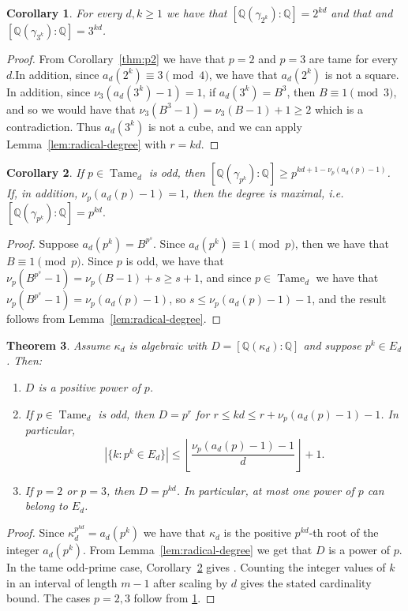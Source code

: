 \documentclass{article}
\theoremstyle{plain}
\newtheorem{theorem}{Theorem}[section]
\newtheorem{corollary}[theorem]{Corollary}
\theoremstyle{definition}
\theoremstyle{remark}
\newcommand{\Q}{\mathbb{Q}}
\DeclareMathOperator{\Tame}{Tame}
\begin{document}
\begin{corollary}\label{cor:degree-23}
For every $d,k\ge1$ we have that $[\Q(\gamma_{2^k}):\Q]=2^{kd}$ and that 
and $[\Q(\gamma_{3^k}):\Q]=3^{kd}$.
\end{corollary}

\begin{proof}
From Corollary~\ref{thm:p2} we have that $p=2$ and $p=3$ are tame for every $d$.In addition, since $a_d(2^k)\equiv3\pmod4$, we have that $a_d(2^k)$ is not a square. In addition, since $\nu_3(a_d(3^k)-1)=1$, if $a_d(3^k)=B^3$, then $B\equiv1\pmod3$, and so we would have that $\nu_3(B^3-1)=\nu_3(B-1)+1\ge2$ which is a contradiction. Thus $a_d(3^k)$ is not a cube, and we can apply Lemma~\ref{lem:radical-degree} with $r=kd$.
\end{proof}

\begin{corollary}\label{cor:tame-degree}
If $p\in \Tame_d$ is odd, then $[\Q(\gamma_{p^k}):\Q]
\ge p^{kd+1-\nu_p(a_d(p)-1)}$. If, in addition, $\nu_p(a_d(p)-1)=1$, then the degree is maximal, i.e. $[\Q(\gamma_{p^k}):\Q]=p^{kd}.$
\end{corollary}

\begin{proof}
Suppose $a_d(p^k)=B^{p^s}$. Since $a_d(p^k)\equiv1\pmod p$, then we have that $B\equiv1\pmod p$. Since $p$ is odd, we have that $\nu_p(B^{p^s}-1)=\nu_p(B-1)+s\ge s+1$, and since $p \in \Tame_d$ we have that $\nu_p(B^{p^s}-1)= \nu_p(a_d(p)-1)$, so $s\le \nu_p(a_d(p)-1)-1$, and the result follows from Lemma~\ref{lem:radical-degree}.
\end{proof}

\begin{theorem}\label{thm:radical-degree}
Assume $\kappa_d$ is algebraic with $D=[\Q(\kappa_d):\Q]$ and suppose $p^k\in E_d$. Then:
\begin{enumerate}
\item $D$ is a positive power of $p$.
\item If $p \in \Tame_d$ is odd, then $D=p^r$ for $r\le kd\le r+\nu_p(a_d(p)-1)-1$. In particular, 
\[
|\{k:p^k\in E_d\}|
\le
\left\lfloor\frac{\nu_p(a_d(p)-1)-1}{d}\right\rfloor+1.
\]
\item If $p=2$ or $p=3$, then $D=p^{kd}$. In particular, at most one power of $p$ can belong to $E_d$.
\end{enumerate}
\end{theorem}

\begin{proof}
Since $\kappa_d^{p^{kd}}=a_d(p^k)$ we have that $\kappa_d$ is the positive $p^{kd}$-th root of the integer $a_d(p^k)$. From Lemma~\ref{lem:radical-degree} we get that $D$ is a power of $p$. In the tame odd-prime case, Corollary~\ref{cor:tame-degree} gives . Counting the integer values of $k$ in an interval of length $m-1$ after scaling by $d$ gives the stated cardinality bound. The cases $p=2,3$ follow from \ref{cor:degree-23}.
\end{proof}
\end{document}

